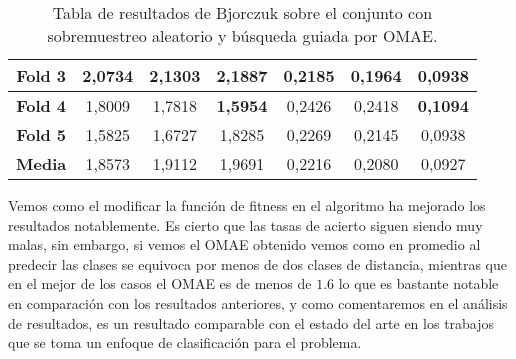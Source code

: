 \begin{table}[H]
{\begin{tabular}{|ccccccc|}
\multicolumn{1}{|c|}{\textbf{Fold 3}}   & \multicolumn{1}{c|}{2,0734}           & \multicolumn{1}{c|}{2,1303}             & \multicolumn{1}{c|}{2,1887}          & \multicolumn{1}{c|}{0,2185}            & \multicolumn{1}{c|}{0,1964}              & 0,0938          \\ \hline
\multicolumn{1}{|c|}{\textbf{Fold 4}}   & \multicolumn{1}{c|}{1,8009}            & \multicolumn{1}{c|}{1,7818}             & \multicolumn{1}{c|}{\textbf{1,5954}} & \multicolumn{1}{c|}{0,2426}            & \multicolumn{1}{c|}{0,2418}              & \textbf{0,1094} \\ \hline
\multicolumn{1}{|c|}{\textbf{Fold 5}}   & \multicolumn{1}{c|}{1,5825}           & \multicolumn{1}{c|}{1,6727}             & \multicolumn{1}{c|}{1,8285}          & \multicolumn{1}{c|}{0,2269}            & \multicolumn{1}{c|}{0,2145}              & 0,0938          \\ \hline
\multicolumn{1}{|c|}{\textbf{Media}}   & \multicolumn{1}{c|}{1,8573}           & \multicolumn{1}{c|}{1,9112}             & \multicolumn{1}{c|}{1,9691}          & \multicolumn{1}{c|}{0,2216}            & \multicolumn{1}{c|}{0,2080}              & 0,0927          \\ \hline
\end{tabular}%
}
\caption{Tabla de resultados de Bjorczuk sobre el conjunto con sobremuestreo aleatorio y búsqueda guiada por OMAE.}\label{tablaBJORCZUKconOMAE}
\end{table}



Vemos como el modificar la función de fitness en el algoritmo ha mejorado los resultados notablemente. Es cierto que las tasas de acierto siguen siendo muy malas, sin embargo, si vemos el OMAE obtenido vemos como en promedio al predecir las clases se equivoca por menos de dos clases de distancia, mientras que en el mejor de los casos el OMAE es de menos de $1.6$ lo que es bastante notable en comparación con los resultados anteriores, y como comentaremos en el análisis de resultados, es un resultado comparable con el estado del arte en los trabajos que se toma un enfoque de clasificación para el problema.

